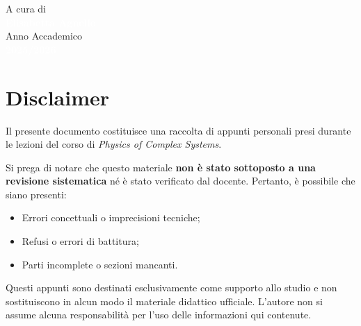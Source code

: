 \documentclass[12pt, a4paper]{book}
\begin{document}
\begin{titlepage}
    \vfill 
    
    \begin{flushleft}
        \textcolor{white!60}{\sffamily\large A cura di}\\[0.2cm]
        \textcolor{white}{\sffamily\huge\textbf{Elisabetta Agnello}}\\[1.2cm]
        
        \textcolor{white!60}{\sffamily\large Anno Accademico}\\[0.2cm]
        \textcolor{white}{\sffamily\Large\textbf{2025/2026}}
    \end{flushleft}
    
    \vspace*{1cm} 
\end{titlepage}

\frontmatter 

\chapter*{Disclaimer}
\thispagestyle{empty} 

Il presente documento costituisce una raccolta di appunti personali presi durante le lezioni del corso di \textit{Physics of Complex Systems}. 

Si prega di notare che questo materiale \textbf{non è stato sottoposto a una revisione sistematica} né è stato verificato dal docente. Pertanto, è possibile che siano presenti:
\begin{itemize}
    \item Errori concettuali o imprecisioni tecniche;
    \item Refusi o errori di battitura;
    \item Parti incomplete o sezioni mancanti.
\end{itemize}

Questi appunti sono destinati esclusivamente come supporto allo studio e non sostituiscono in alcun modo il materiale didattico ufficiale. L'autore non si assume alcuna responsabilità per l'uso delle informazioni qui contenute.

\vspace{3cm} 
\end{document}
